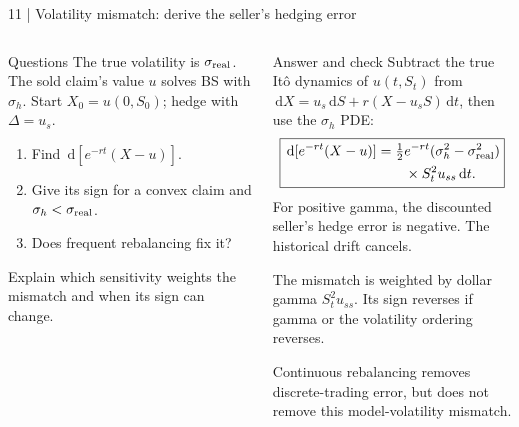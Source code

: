 \documentclass[handout,10pt,t,aspectratio=169]{beamer}
\newcommand{\dd}{\,\mathrm d}
\newenvironment{questions}{\begin{block}{Questions}}{\end{block}}
\newenvironment{answers}{\begin{exampleblock}{Answer and check}}{\end{exampleblock}}
\newcommand{\compact}{\small%
 \setlength{\abovedisplayskip}{3pt}%
 \setlength{\belowdisplayskip}{3pt}%
 \setlength{\abovedisplayshortskip}{2pt}%
 \setlength{\belowdisplayshortskip}{2pt}%
 \setlength{\parskip}{2pt}}
\begin{document}
\begin{frame}{11 | Volatility mismatch: derive the seller's hedging error}
\compact
\begin{columns}[T,onlytextwidth]
\begin{questions}
The true volatility is \(\sigma_{\rm real}\). The sold claim's value \(u\)
solves BS with \(\sigma_h\).
Start \(X_0=u(0,S_0)\); hedge with \(\Delta=u_s\).
\begin{enumerate}
\item Find \(\dd[e^{-rt}(X-u)]\).
\item Give its sign for a convex claim and \(\sigma_h<\sigma_{\rm real}\).
\item Does frequent rebalancing fix it?
\end{enumerate}
Explain which sensitivity weights the mismatch and when its sign can change.
\end{questions}
\begin{answers}
Subtract the true It\^o dynamics of \(u(t,S_t)\) from
\(\dd X=u_s\dd S+r(X-u_sS)\dd t\), then use the \(\sigma_h\) PDE:
\[
 \boxed{\begin{aligned}
 \dd[e^{-rt}(X-u)]
 &=\tfrac12e^{-rt}(\sigma_h^2-\sigma_{\rm real}^2)\\
 &\qquad{}\times S_t^2u_{ss}\dd t.
 \end{aligned}}
\]
For positive gamma, the discounted seller's hedge error is negative.
The historical drift cancels.

The mismatch is weighted by dollar gamma \(S_t^2u_{ss}\).
Its sign reverses if gamma or the volatility ordering reverses.

Continuous rebalancing removes discrete-trading error, but does not
remove this model-volatility mismatch.
\end{answers}
\end{columns}
\end{frame}
\end{document}

